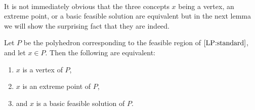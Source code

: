 \paragraph{} It is not immediately obvious that the three concepts $x$ being a vertex, an extreme point, or a basic feasible solution are equivalent but in the next lemma we will show the surprising fact that they are indeed.
\begin{lemma} \label{lemma:bfs-equiv}Let $P$ be the polyhedron corresponding to the feasible region of $\ref{LP:standard}$, and let $x \in P$. Then the following are equivalent: 
\begin{enumerate}
\item $x$ is a vertex of $P$,
\item $x$ is an extreme point of $P$, 
\item and $x$ is a basic feasible solution of $P$.
\end{enumerate}
\end{lemma}
